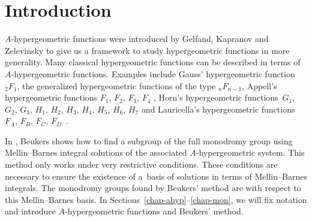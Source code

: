 \documentclass[pdftex]{sigma}
\numberwithin{equation}{section}
\begin{document}
\allowdisplaybreaks

\newcommand{\arXivNumber}{2011.00707}

\renewcommand{\PaperNumber}{048}

\FirstPageHeading










\section{Introduction}%

$A$-hypergeometric functions were introduced by Gelfand, Kapranov and Zelevinsky \cite{GKZ87, GKZ90, GKZ88, GKZ89} to give us a framework to study hypergeometric functions in more generality. Many classical hypergeometric functions can be described in terms of $A$-hypergeometric functions. Examples include Gauss' hypergeometric function ${}_2F_1$, the generalized hypergeometric functions of the type ${}_{n}F_{n-1}$, Appell's hypergeometric functions $F_1$, $F_2$, $F_3$, $F_4$ \cite{App80,App82}, Horn's hypergeometric functions~$G_1$, $G_2$, $G_3$, $H_1$, $H_2$, $H_3$, $H_4$, $H_5$, $H_6$, $H_7$ \cite{Hor89,HO31} and Lauricella's hypergeometric functions $F_A$, $F_B$, $F_C$, $F_D$~\cite{Lau93}.

In \cite{Beu13}, Beukers shows how to find a subgroup of the full monodromy group using Mellin--Barnes integral solutions of the associated $A$-hypergeometric system. This method only works under very restrictive conditions. These conditions are necessary to ensure the existence of a~basis of solutions in terms of Mellin--Barnes integrals. The monodromy groups found by Beukers' method are with respect to this Mellin--Barnes basis. In Sections~\ref{chap-ahyp}--\ref{chap-mon}, we will fix notation and introduce $A$-hypergeometric functions and Beukers' method.
\end{document}
